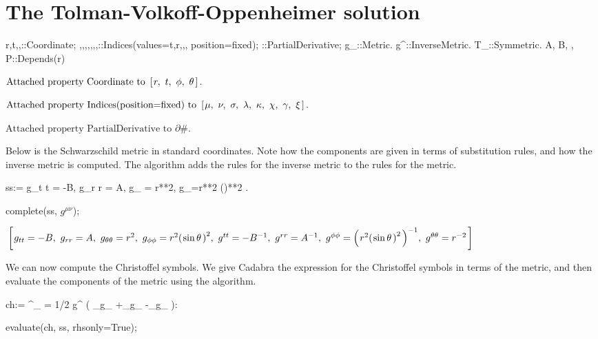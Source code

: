 \documentclass[10pt]{article}
\newcommand{\algo}[1]{{\tt \detokenize{#1}}}
\newcommand\brwrap[3]{%
  \setbox0=\hbox{$#2$}
  \left#1\vbox to \the\ht0{\hbox to 0pt{}}\right.\kern-.2em
  \begingroup #2\endgroup\kern-.15em
  \left.\vbox to \the\ht0{\hbox to 0pt{}}\right#3
}
\begin{document}
\section*{The Tolman-Volkoff-Oppenheimer solution}


\begin{python}
{r,t,\phi,\theta}::Coordinate;
{\mu,\nu,\sigma,\lambda,\kappa,\chi,\gamma,\xi}::Indices(values={t,r,\phi,\theta}, position=fixed);
\partial{#}::PartialDerivative;
g_{\mu\nu}::Metric.
g^{\mu\nu}::InverseMetric.
T_{\mu\nu}::Symmetric.
{A, B, \rho, P}::Depends(r)
\end{python}
\begin{adjustwidth}{1em}{0cm}${}\text{Attached property Coordinate to~}\brwrap{[}{r,~ t,~ \phi,~ \theta}{]}.$\end{adjustwidth}
\begin{adjustwidth}{1em}{0cm}${}\text{Attached property Indices(position=fixed) to~}\brwrap{[}{\mu,~ \nu,~ \sigma,~ \lambda,~ \kappa,~ \chi,~ \gamma,~ \xi}{]}.$\end{adjustwidth}
\begin{adjustwidth}{1em}{0cm}${}\text{Attached property PartialDerivative to~}\partial{\#}.$\end{adjustwidth}
Below is the Schwarzschild metric in standard coordinates. Note how the components are
given in terms of substitution rules, and how the inverse metric is computed. 
The \algo{complete} algorithm adds the rules for the inverse metric to the rules for the metric.
\begin{python}
ss:= { g_{t t} = -B,   
       g_{r r} = A, 
       g_{\theta\theta} = r**2, 
       g_{\phi\phi}=r**2 \sin(\theta)**2
     }.

complete(ss, $g^{\mu\nu}$);
\end{python}
\begin{adjustwidth}{1em}{0cm}${}\brwrap{[}{g_{t t} = -B,~ g_{r r} = A,~ g_{\theta \theta} = {r}^{2},~ g_{\phi \phi} = {r}^{2} {\brwrap{(}{\sin{\theta}}{)}}^{2},~ g^{t t} = -{B}^{-1},~ g^{r r} = {A}^{-1},~ g^{\phi \phi} = {\brwrap{(}{{r}^{2} {\brwrap{(}{\sin{\theta}}{)}}^{2}}{)}}^{-1},~ g^{\theta \theta} = {r}^{-2}}{]}$\end{adjustwidth}
We can now compute the Christoffel symbols. We give Cadabra the expression for the 
Christoffel symbols in terms of the metric, and then evaluate the components of the
metric using the \algo{evaluate} algorithm.
\begin{python}
ch:= \Gamma^{\mu}_{\nu\xi} = 1/2 g^{\mu\sigma} ( 
                                   \partial_{\xi}{g_{\nu\sigma}} 
                                  +\partial_{\nu}{g_{\xi\sigma}}
                                  -\partial_{\sigma}{g_{\nu\xi}} ):
                          
evaluate(ch, ss, rhsonly=True);
\end{python}
\end{document}
